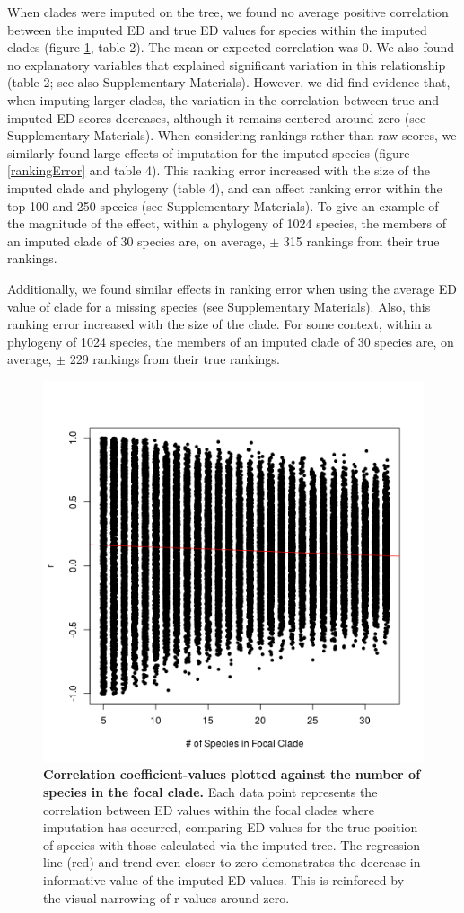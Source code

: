 \documentclass[12pt,english]{article}
\begin{document}
When clades were imputed on the tree, we found no average positive correlation
between the imputed ED and true ED values for species within the imputed clades
(figure \ref{imputationTrend}, table 2). The mean or expected correlation was 0.
We also found no explanatory variables that explained significant variation in
this relationship (table 2; see also Supplementary Materials). However, we did
find evidence that, when imputing larger clades, the variation in the
correlation between true and imputed ED scores decreases, although it remains
centered around zero (see Supplementary Materials). When considering rankings
rather than raw scores, we similarly found large effects of imputation for the
imputed species (figure \ref{rankingError} and table 4). This ranking error
increased with the size of the imputed clade and phylogeny (table 4), and can
affect ranking error within the top 100 and 250 species (see Supplementary
Materials). To give an example of the magnitude of the effect, within a
phylogeny of 1024 species, the members of an imputed clade of 30 species are, on
average, $\pm$ 315 rankings from their true rankings.

Additionally, we found similar effects in ranking error when using the average
ED value of clade for a missing species (see Supplementary Materials). Also,
this ranking error increased with the size of the clade. For some context,
within a phylogeny of 1024 species, the members of an imputed clade of 30
species are, on average, $\pm$ 229 rankings from their true rankings. 


\begin{figure}[!ht]
  \center
  \includegraphics[width=.5\textwidth]{edModel.png}
  \caption{\textbf{Correlation coefficient-values plotted against the number of
  species in the focal clade.} Each data point  represents the correlation
  between ED values within the focal clades where imputation has occurred,
  comparing ED values for the true position of species with those calculated via
  the imputed tree. The regression line (red) and trend even closer to zero
  demonstrates the decrease in informative value of the imputed ED values. This
  is reinforced by the visual narrowing of r-values around zero.}
  \label{imputationTrend}
\end{figure}
\end{document}
